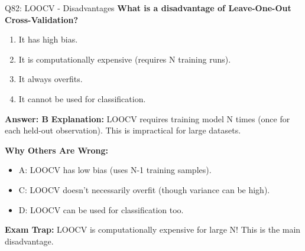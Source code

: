 \documentclass[8pt]{beamer}
\begin{document}
	\begin{frame}{Q82: LOOCV - Disadvantages}
		\fontsize{6.5}{7.5}\selectfont
		\textbf{What is a disadvantage of Leave-One-Out Cross-Validation?}
		
		\begin{enumerate}
			\item It has high bias.
			\item It is computationally expensive (requires N training runs).
			\item It always overfits.
			\item It cannot be used for classification.
		\end{enumerate}
		
		\vspace{0.05cm}
		\textcolor{myblue}{\textbf{Answer: B}}
		\vspace{0.05cm}
		\textcolor{myblue}{\textbf{Explanation:}} LOOCV requires training model N times (once for each held-out observation). This is impractical for large datasets.
		
		\vspace{0.05cm}
		\textcolor{myred}{\textbf{Why Others Are Wrong:}}
		\begin{itemize}
			\item \textcolor{myred}{A:} LOOCV has low bias (uses N-1 training samples).
			\item \textcolor{myred}{C:} LOOCV doesn't necessarily overfit (though variance can be high).
			\item \textcolor{myred}{D:} LOOCV can be used for classification too.
		\end{itemize}
		
		\textcolor{myred}{\textbf{Exam Trap:}} LOOCV is \textcolor{myred}{computationally expensive} for large N! This is the main disadvantage.
	\end{frame}
	
\end{document}

